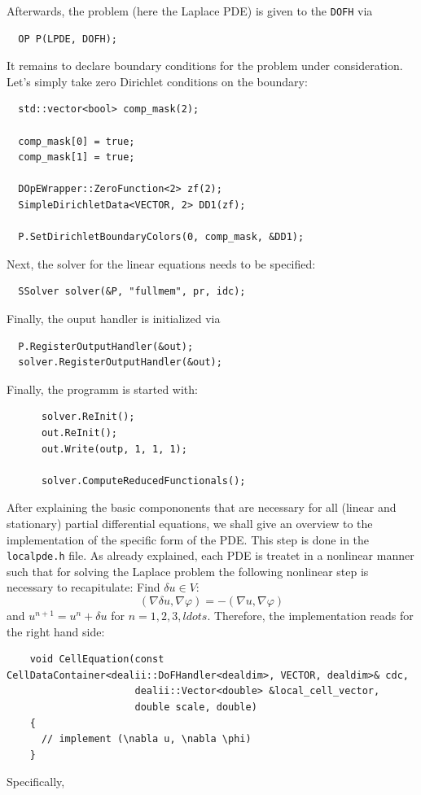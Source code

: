 \documentclass[prodmode,acmtoms]{acmsmall}
\numberwithin{equation}{section}
\renewcommand{\phi}{\varphi}
\begin{document}
Afterwards, the problem (here the Laplace PDE) is given to the \texttt{DOFH} via
\begin{lstlisting}
  OP P(LPDE, DOFH);
\end{lstlisting}
It remains to declare boundary conditions for the problem under consideration. 
Let's simply take zero Dirichlet conditions on the boundary:
\begin{lstlisting}
  std::vector<bool> comp_mask(2);

  comp_mask[0] = true;
  comp_mask[1] = true;

  DOpEWrapper::ZeroFunction<2> zf(2);
  SimpleDirichletData<VECTOR, 2> DD1(zf);

  P.SetDirichletBoundaryColors(0, comp_mask, &DD1);
\end{lstlisting}
Next, the solver for the linear equations needs to be specified:
\begin{lstlisting}
  SSolver solver(&P, "fullmem", pr, idc);
\end{lstlisting}
Finally, the ouput handler is initialized via
\begin{lstlisting}
  P.RegisterOutputHandler(&out);
  solver.RegisterOutputHandler(&out);
\end{lstlisting}
Finally, the programm is started with:
\begin{lstlisting}
      solver.ReInit();
      out.ReInit();
      out.Write(outp, 1, 1, 1);

      solver.ComputeReducedFunctionals();
\end{lstlisting}
After explaining the basic compononents that are necessary for all  
(linear and stationary) partial differential equations, we shall give 
an overview to the implementation of the specific form of the PDE. 
This step is done in the \texttt{localpde.h} file. As already explained,
each PDE is treatet in a nonlinear manner such that for solving 
the Laplace problem the following nonlinear step is necessary to recapitulate:
Find $\delta u\in V$:
\[
(\nabla \delta u, \nabla \phi) = -(\nabla u, \nabla \phi) 
\]
and $u^{n+1} = u^n + \delta u$ for $n=1,2,3,ldots$.
Therefore, the implementation reads for the right hand side:
\begin{lstlisting}
    void CellEquation(const CellDataContainer<dealii::DoFHandler<dealdim>, VECTOR, dealdim>& cdc,
                      dealii::Vector<double> &local_cell_vector,
                      double scale, double)
    {
      // implement (\nabla u, \nabla \phi) 
    }
\end{lstlisting}
Specifically,
\end{document}
